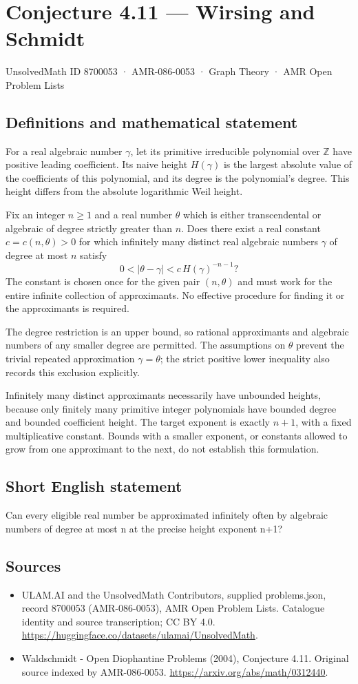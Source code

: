 \documentclass[11pt,a4paper]{article}
\begin{document}
\section*{Conjecture 4.11 — Wirsing and Schmidt}\label{8700053}
{\small UnsolvedMath ID 8700053 · AMR-086-0053 · Graph Theory · AMR Open Problem Lists}
\subsection{Definitions and mathematical statement}
For a real algebraic number $\gamma$, let its primitive irreducible polynomial over $\mathbb Z$ have positive leading coefficient. Its naive height $H(\gamma)$ is the largest absolute value of the coefficients of this polynomial, and its degree is the polynomial's degree. This height differs from the absolute logarithmic Weil height.

Fix an integer $n\ge1$ and a real number $\theta$ which is either transcendental or algebraic of degree strictly greater than $n$. Does there exist a real constant $c=c(n,\theta)>0$ for which infinitely many distinct real algebraic numbers $\gamma$ of degree at most $n$ satisfy
\[
0<|\theta-\gamma|<c\,H(\gamma)^{-n-1}?
\]
The constant is chosen once for the given pair $(n,\theta)$ and must work for the entire infinite collection of approximants. No effective procedure for finding it or the approximants is required.

The degree restriction is an upper bound, so rational approximants and algebraic numbers of any smaller degree are permitted. The assumptions on $\theta$ prevent the trivial repeated approximation $\gamma=\theta$; the strict positive lower inequality also records this exclusion explicitly.

Infinitely many distinct approximants necessarily have unbounded heights, because only finitely many primitive integer polynomials have bounded degree and bounded coefficient height. The target exponent is exactly $n+1$, with a fixed multiplicative constant. Bounds with a smaller exponent, or constants allowed to grow from one approximant to the next, do not establish this formulation.
\subsection{Short English statement}
Can every eligible real number be approximated infinitely often by algebraic numbers of degree at most n at the precise height exponent n+1?
\subsection{Sources}
\begin{itemize}
\item[S1] ULAM.AI and the UnsolvedMath Contributors, supplied problems.json, record 8700053 (AMR-086-0053), AMR Open Problem Lists. Catalogue identity and source transcription; CC BY 4.0.
\url{https://huggingface.co/datasets/ulamai/UnsolvedMath}.
\item[S2] Waldschmidt - Open Diophantine Problems (2004), Conjecture 4.11. Original source indexed by AMR-086-0053.
\url{https://arxiv.org/abs/math/0312440}.
\end{itemize}
\end{document}
